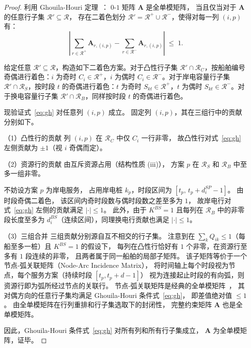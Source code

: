 \documentclass[UTF8, a4paper, 12pt]{ctexart}
\theoremstyle{plain}
\theoremstyle{definition}
\theoremstyle{remark}
\begin{document}
\begin{proof}
利用 Ghouila-Houri 定理~\cite{Papadimitriou1998}：
$0$-$1$ 矩阵 $\mathbf{A}$ 是全单模矩阵，
当且仅当对于 $\mathbf{A}$ 的任意行子集 $\mathcal{R}'\subseteq\mathcal{R}$，
存在二着色划分 $\mathcal{R}'=\mathcal{R}^+\cup\mathcal{R}^-$，使得对每一列 $(i,p)$ 有：
\begin{equation}
  \left|
    \sum_{r\in\mathcal{R}^+}\mathbf{A}_{r,(i,p)}
    -
    \sum_{r\in\mathcal{R}^-}\mathbf{A}_{r,(i,p)}
  \right|
  \;\le\; 1.
  \label{eq:gh}
\end{equation}

给定任意 $\mathcal{R}'\subseteq\mathcal{R}$，构造如下二着色方案。对于凸性行子集 $\mathcal{R}'\cap\mathcal{R}_C$，按船舶编号奇偶进行着色：$i$ 为奇时 $C_i\in\mathcal{R}^+$，$i$ 为偶时 $C_i\in\mathcal{R}^-$。对于岸电容量行子集 $\mathcal{R}'\cap\mathcal{R}_S$，按时段 $t$ 的奇偶进行着色：$t$ 为奇时 $S_{kt}\in\mathcal{R}^+$，$t$ 为偶时 $S_{kt}\in\mathcal{R}^-$。对于换电容量行子集 $\mathcal{R}'\cap\mathcal{R}_B$，同样按时段 $t$ 的奇偶进行着色。

现验证式~\eqref{eq:gh} 对任意列 $(i,p)$ 成立。
固定列 $(i,p)$，其在三组行中的贡献分别如下。

\medskip
\noindent（1）凸性行的贡献
列 $(i,p)$ 在 $\mathcal{R}_C$ 中仅 $C_i$ 一行非零，
故凸性行对式~\eqref{eq:gh} 左侧贡献为 $\pm 1$（视 $i$ 奇偶而定）。

\medskip
\noindent（2）资源行的贡献
由互斥资源占用（结构性质 (iii)），
方案 $p$ 在 $\mathcal{R}_S$ 和 $\mathcal{R}_B$ 中至多一组非零。

不妨设方案 $p$ 为岸电服务，
占用岸电桩 $k_p$，时段区间为 $[t_p,\,t_p+d_i^{SP}-1]$。
由时段奇偶二着色，
该区间内奇时段数与偶时段数之差至多为 $1$，
故岸电行对式~\eqref{eq:gh} 左侧的贡献满足 $|\cdot|\le 1$。
此外，由于 $K^{BS}=1$ 且每列在 $\mathcal{R}_B$ 中的非零段长度至多为
$d_i^{BS}$（连续区间），同理换电行贡献也满足 $|\cdot|\le 1$。

\medskip
\noindent（3）三组合并
三组贡献分别源自互不相交的行子集。
注意到在 $\sum_k Q_{ik}\le 1$（每船至多一桩）且 $K^{BS}=1$ 的假设下，
每列在凸性行恰好有 $1$ 个非零，在资源行至多有 $1$ 段连续的非零，
且两者属于同一船舶的局部子矩阵。
该子矩阵等价于一个节点-弧关联矩阵（Node-Arc Incidence Matrix），
将时间轴上每个时段视为节点，每个服务方案（持续时段 $[t_p, t_p+d-1]$）
视为连接起止时段的有向弧，则资源行即为弧所经过节点的关联行。
节点-弧关联矩阵是经典的全单模矩阵~\cite{Nemhauser1988}，
其对偶方向的任意行子集均满足 Ghouila-Houri 条件式~\eqref{eq:gh}，
即差值绝对值 $\le 1$。
由全单模矩阵在行列重排和行子集选取下的封闭性，
完整约束矩阵 $\mathbf{A}$ 也是全单模矩阵。

因此，Ghouila-Houri 条件式~\eqref{eq:gh} 对所有列和所有行子集成立，
$\mathbf{A}$ 为全单模矩阵，证毕。
\end{proof}
\end{document}
